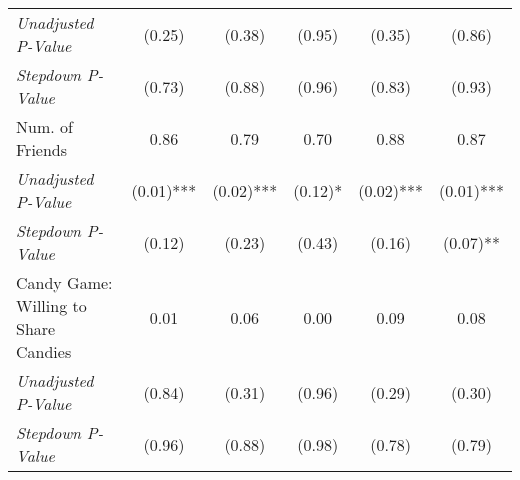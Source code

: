\begin{tabular}{l c c c c c}
\quad \textit{Unadjusted P-Value} & (0.25) & (0.38) & (0.95) & (0.35) & (0.86) \\
\quad \textit{Stepdown P-Value} & (0.73) & (0.88) & (0.96) & (0.83) & (0.93) \\
Num. of Friends & 0.86 & 0.79 & 0.70 & 0.88 & 0.87 \\
\quad \textit{Unadjusted P-Value} & (0.01)*** & (0.02)*** & (0.12)* & (0.02)*** & (0.01)*** \\
\quad \textit{Stepdown P-Value} & (0.12) & (0.23) & (0.43) & (0.16) & (0.07)** \\
Candy Game: Willing to Share Candies & 0.01 & 0.06 & 0.00 & 0.09 & 0.08 \\
\quad \textit{Unadjusted P-Value} & (0.84) & (0.31) & (0.96) & (0.29) & (0.30) \\
\quad \textit{Stepdown P-Value} & (0.96) & (0.88) & (0.98) & (0.78) & (0.79) \\
\bottomrule
\end{tabular}
